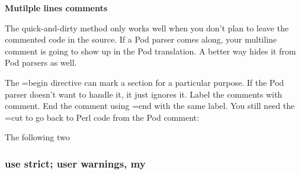 \documentclass[]{book}
\makeatletter
\newenvironment{Shaded}{\begin{snugshade}}{\end{snugshade}}
\newcommand{\KeywordTok}[1]{\textcolor[rgb]{0.13,0.29,0.53}{\textbf{#1}}}
\newcommand{\DataTypeTok}[1]{\textcolor[rgb]{0.13,0.29,0.53}{#1}}
\newcommand{\CharTok}[1]{\textcolor[rgb]{0.31,0.60,0.02}{#1}}
\newcommand{\StringTok}[1]{\textcolor[rgb]{0.31,0.60,0.02}{#1}}
\newcommand{\CommentTok}[1]{\textcolor[rgb]{0.56,0.35,0.01}{\textit{#1}}}
\newcommand{\FunctionTok}[1]{\textcolor[rgb]{0.00,0.00,0.00}{#1}}
\newcommand{\NormalTok}[1]{#1}
\newenvironment{kframe}{%
\medskip{}
\setlength{\fboxsep}{.8em}
 \def\at@end@of@kframe{}%
 \ifinner\ifhmode%
  \def\at@end@of@kframe{\end{minipage}}%
  \begin{minipage}{\columnwidth}%
 \fi\fi%
 \def\FrameCommand##1{\hskip\@totalleftmargin \hskip-\fboxsep
 \colorbox{shadecolor}{##1}\hskip-\fboxsep
     \hskip-\linewidth \hskip-\@totalleftmargin \hskip\columnwidth}%
 \MakeFramed {\advance\hsize-\width
   \@totalleftmargin\z@ \linewidth\hsize
   \@setminipage}}%
 {\par\unskip\endMakeFramed%
 \at@end@of@kframe}
\renewenvironment{Shaded}{\begin{kframe}}{\end{kframe}}
\theoremstyle{definition}
\theoremstyle{definition}
\theoremstyle{definition}
\theoremstyle{remark}
\let\BeginKnitrBlock\begin \let\EndKnitrBlock\end
\makeatother
\begin{document}
\BeginKnitrBlock{rmdtip}
\textbf{Mutilple lines comments}

The quick-and-dirty method only works well when you don't plan to leave
the commented code in the source. If a Pod parser comes along, your
multiline comment is going to show up in the Pod translation. A better
way hides it from Pod parsers as well.

The =begin directive can mark a section for a particular purpose. If the
Pod parser doesn't want to handle it, it just ignores it. Label the
comments with comment. End the comment using =end with the same label.
You still need the =cut to go back to Perl code from the Pod comment:
\EndKnitrBlock{rmdtip}

The following two

\subsubsection{use strict; user warnings,
my}\label{use-strict-user-warnings-my}

\begin{Shaded}
\end{Shaded}
\end{document}
